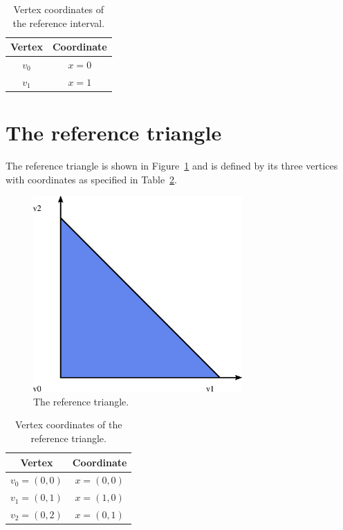 \begin{table}[H]
\linespread{1.2}\selectfont
  \begin{center}
    \begin{tabular}{|c|c|}
      \hline
      Vertex & Coordinate \\
      \hline
      \hline
      $v_0$ & $x = 0$ \\
      \hline
      $v_1$ & $x = 1$ \\
      \hline
    \end{tabular}
    \caption{Vertex coordinates of the reference interval.}
    \label{tab:interval,vertices}
  \end{center}
\end{table}

\newpage
\section{The reference triangle}

The reference triangle is shown in Figure~\ref{fig:triangle} and is
defined by its three vertices with coordinates as specified in
Table~\ref{tab:triangle,vertices}.

\begin{figure}[H]
  \begin{center}
    \includegraphics[width=8cm]{eps/triangle.eps}
    \caption{The reference triangle.}
    \label{fig:triangle}
  \end{center}
\end{figure}

\begin{table}[H]
\linespread{1.2}\selectfont
  \begin{center}
    \begin{tabular}{|c|c|}
      \hline
      Vertex & Coordinate \\
      \hline
      \hline
      $v_0 = (0, 0)$ & $x = (0, 0)$ \\
      \hline
      $v_1 = (0, 1)$ & $x = (1, 0)$ \\
      \hline
      $v_2 = (0, 2)$ & $x = (0, 1)$ \\
      \hline
    \end{tabular}
    \caption{Vertex coordinates of the reference triangle.}
    \label{tab:triangle,vertices}
  \end{center}
\end{table}

